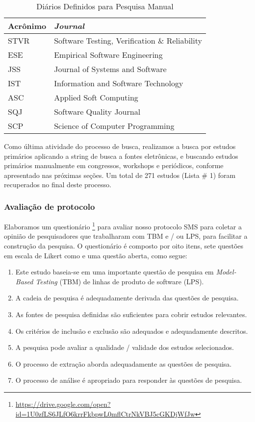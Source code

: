 \begin{table}[!ht]
	\centering
	\scriptsize
	\caption{Diários Definidos para Pesquisa Manual}
	\label{table:journals}
	\begin{tabular}{l|l}
		\hline \hline
		\textbf{Acrônimo} & \textbf{\textit{Journal}}                    \\\hline
		STVR					 & Software Testing, Verification \& Reliability \\\hline
		ESE            & Empirical Software Engineering      \\\hline
		JSS            & Journal of Systems and Software     \\\hline
		IST            & Information and Software Technology \\\hline
		ASC            & Applied Soft Computing              \\\hline
		SQJ            & Software Quality Journal            \\\hline
		SCP            & Science of Computer Programming     \\\hline
		\hline
	\end{tabular}
\end{table}

Como última atividade do processo de busca, realizamos a busca por estudos primários aplicando a string de busca a fontes eletrônicas, e buscando estudos primários manualmente em congressos, workshops e periódicos, conforme apresentado nas próximas seções. Um total de 271 estudos (Lista \# 1) foram recuperados no final deste processo.

\subsubsection{Avaliação de protocolo}

Elaboramos um questionário \footnote{\url{https://drive.google.com/open?id=1U0zfLS6JLfO6krrFkbpwL0mflCtrNkVBJ5cGKDjWfJw}} para avaliar nosso protocolo SMS para coletar a opinião de pesquisadores que trabalharam com TBM e / ou LPS, para facilitar a construção da pesquisa. O questionário é composto por oito itens, sete questões em escala de Likert como \cite{li2013novel} e uma questão aberta, como segue:

\begin{enumerate}
	\item Este estudo baseia-se em uma importante questão de pesquisa em \textit{Model-Based Testing} (TBM) de linhas de produto de software (LPS).
	\item A cadeia de pesquisa é adequadamente derivada das questões de pesquisa.
	\item As fontes de pesquisa definidas são suficientes para cobrir estudos relevantes.
	\item Os critérios de inclusão e exclusão são adequados e adequadamente descritos.
	\item A pesquisa pode avaliar a qualidade / validade dos estudos selecionados.
	\item O processo de extração aborda adequadamente as questões de pesquisa.
	\item O processo de análise é apropriado para responder às questões de pesquisa.
\end{enumerate}

